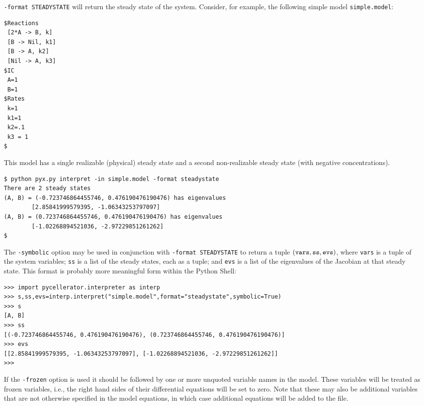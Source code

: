 {\tt -format STEADYSTATE} will return the steady state of the system. Consider, for example, the following simple model {\tt simple.model}:
\begin{footnotesize}
\begin{Verbatim}[frame=single]
$Reactions
 [2*A -> B, k]
 [B -> Nil, k1]
 [B -> A, k2]
 [Nil -> A, k3]
$IC
 A=1
 B=1
$Rates
 k=1
 k1=1
 k2=.1
 k3 = 1
$
\end{Verbatim}
\end{footnotesize}
This model has a single realizable (physical) steady state and a second non-realizable steady state (with negative concentrations).
\begin{Verbatim}[frame=single]
$ python pyx.py interpret -in simple.model -format steadystate
There are 2 steady states
(A, B) = (-0.723746864455746, 0.476190476190476) has eigenvalues 
        [2.85841999579395, -1.06343253797097]
(A, B) = (0.723746864455746, 0.476190476190476) has eigenvalues 
        [-1.02268894521036, -2.97229851261262]
$
\end{Verbatim}

The {\tt -symbolic} option may be used in conjunction with {\tt -format STEADYSTATE} to return a tuple ${\tt (vars,ss,evs)}$, where {\tt vars} is a tuple of the system variables; {\tt ss} is a list of the steady states, each as a tuple; and {\tt evs} is a list of the eigenvalues of the Jacobian at that steady state. This format is probably more meaningful form within the Python Shell: 

\begin{footnotesize}
\begin{Verbatim}[frame=single]
>>> import pycellerator.interpreter as interp
>>> s,ss,evs=interp.interpret("simple.model",format="steadystate",symbolic=True)
>>> s
[A, B]
>>> ss
[(-0.723746864455746, 0.476190476190476), (0.723746864455746, 0.476190476190476)]
>>> evs
[[2.85841999579395, -1.06343253797097], [-1.02268894521036, -2.97229851261262]]
>>>
\end{Verbatim}
\end{footnotesize}



If the {\tt -frozen} option is used it should be followed by one or more unquoted variable names in the model. These variables will be treated as frozen variables, i.e., the right hand sides of their differential equations will be set to zero. Note that these may also be additional variables that are not otherwise specified in the model equations, in which case additional equations will be added to the file. 


